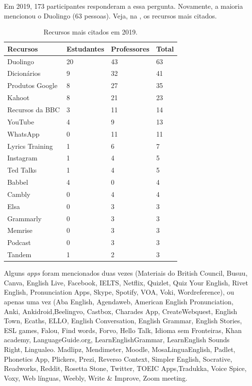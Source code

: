 \documentclass[portuguese]{textolivre}
\begin{document}
Em 2019, 173 participantes responderam a essa pergunta. Novamente, a maioria mencionou o Duolingo (63 pessoas). Veja, na , os recursos mais citados.

\begin{table}[htpb]
\caption{Recursos mais citados em 2019.}
\label{tbl02}
\begin{tabularx}{\linewidth}{XXXX}
\toprule 
\textbf{Recursos}  & \textbf{Estudantes} & \textbf{Professores} & \textbf{Total} \\ 
\midrule
Duolingo & 20 & 43 & 63 \\
Dicionários & 9 & 32 & 41 \\
Produtos Google & 8 & 27 & 35 \\
Kahoot & 8 & 21 & 23 \\
Recursos da BBC & 3 & 11 & 14 \\
YouTube & 4 & 9 & 13 \\
WhatsApp & 0 & 11 & 11 \\
Lyrics Training & 1 & 6 & 7 \\
Instagram & 1 & 4 & 5 \\
Ted Talks & 1 & 4 & 5 \\
Babbel & 4 & 0 & 4 \\
Cambly & 0 & 4 & 4 \\
Elsa & 0 & 3 & 3 \\
Grammarly & 0 & 3 & 3 \\
Memrise & 0 & 3 & 3 \\
Podcast & 0 & 3 & 3 \\
Tandem & 1 & 2 & 3 \\
\bottomrule
\end{tabularx}
\end{table}

Alguns \textit{apps} foram mencionados duas vezes (Materiais do British Council, Busuu, Canva, English Live, Facebook, IELTS, Netflix, Quizlet, Quiz Your English, Rivet English, Pronunciation Apps, Skype, Spotify,  VOA, Voki, Wordreference), ou apenas uma vez (Aba English, Agendaweb, American English Pronunciation, Anki, Ankidroid,Beelingvo, Castbox, Charades App, CreateWebquest, English Town, Ecaths, ELLO, English Conversation, English Grammar, English Stories, ESL games, Falou, Find words, Forvo, Hello Talk, Idioma sem Fronteiras, Khan academy, LanguageGuide.org, LearnEnglishGrammar, LearnEnglish Sounds Right, Lingualeo. Madlipz, Mendimeter, Moodle, MosaLinguaEnglish, Padlet, Phonetics App, Plickers, Prezi, Reverso Context, Simpler English, Socrative, Readworks, Reddit, Rosetta Stone, Twitter, TOEIC Apps,Tradukka, Voice Spice, Voxy, Web línguas, Weebly, Write \& Improve, Zoom meeting.
\end{document}
